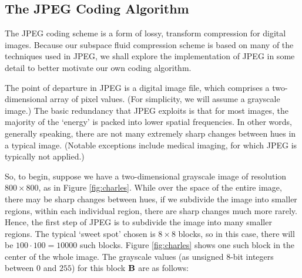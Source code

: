 \subsection{The JPEG Coding Algorithm}
The JPEG coding scheme is a form of lossy, transform compression for digital images. Because our subspace fluid compression scheme is based on many of the techniques used in JPEG, we shall explore the implementation of JPEG in some detail to better motivate our own coding algorithm. 

The point of departure in JPEG is a digital image file, which comprises a two-dimensional array of pixel values. (For simplicity, we will assume a grayscale image.) The basic redundancy that JPEG exploits is that for most images, the majority of the `energy' is packed into lower spatial frequencies. In other words, generally speaking, there are not many extremely sharp changes between hues in a typical image. (Notable exceptions include medical imaging, for which JPEG is typically not applied.) 

So, to begin, suppose we have a two-dimensional grayscale image of resolution $800 \times 800$, as in Figure \ref{fig:charles}. While over the space of the entire image, there may be sharp changes between hues, if we subdivide the image into smaller regions, within each individual region, there are sharp changes much more rarely. Hence, the first step of JPEG is to subdivide the image into many smaller regions. The typical `sweet spot' chosen is $8 \times 8$ blocks, so in this case, there will be $100 \cdot 100 = 10 000$ such blocks. Figure  \ref{fig:charles} shows one such block in the center of the whole image. The grayscale values (as unsigned $8$-bit integers between $0$ and $255$) for this block $\mathbf{B}$ are as follows:

